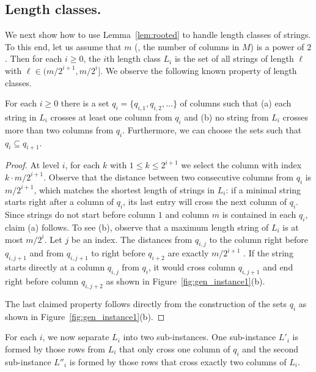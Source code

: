 \subsection{Length classes.}\label{sec:length-classes}
We next show how to use Lemma~\ref{lem:rooted} to handle length classes of strings.
To this end, let us assume \WLOG that $m$ (\ie, the number of columns in $M$) is a power of $2$.
Then for each $i \ge 0$, the $i$th length class $L_i$ is the set of all strings of length $\ell$ with $\ell \in (m/2^{i+1}, m/2^{i}]$. 
We observe the following known property of length classes.
\begin{lemma}\label{lem:half}
    For each $i \ge 0$ there is a set $q_i = \{q_{i,1},q_{i,2},\dotsc\}$ of columns such that (a) each string in $L_i$ crosses at least one column from $q_i$ and (b) no string from $L_i$ crosses more than two columns from $q_i$.
    Furthermore, we can choose the sets such that $q_i \subseteq q_{i+1}$.
\end{lemma}
\begin{proof}
    At level $i$, for each $k$ with $1 \le k \le 2^{i+1}$ we select the column with index $k \cdot m/2^{i+1}$.
    Observe that the distance between two consecutive columns from $q_i$ is $m/2^{i+1}$, which matches the shortest length of strings in $L_i$: if a minimal string starts right after a column of $q_i$, its last entry will cross the next column of $q_i$. 
    Since strings do not start before column $1$ and column $m$ is contained in each $q_i$, claim (a) follows.
    To see (b), observe that a maximum length string of $L_i$ is at most $m/2^i$.
    Let $j$ be an index. 
    The distances from $q_{i,j}$ to the column right before $q_{i,j+1}$ and from $q_{i,j+1}$ to right before $q_{i+2}$ are exactly $m/2^{i+1}$ .
    If the string starts directly at a column $q_{i,j}$ from $q_i$, it would cross column $q_{i,j+1}$ and end right before column $q_{i,j+2}$ as shown in Figure~\ref{fig:gen_instance1}(b).

    The last claimed property follows directly from the construction of the sets $q_i$ as shown in Figure~\ref{fig:gen_instance1}(b).
\end{proof}

For each $i$, we now separate $L_i$ into two sub-instances.
One sub-instance $L'_i$ is formed by those rows from $L_i$ that only cross one column of $q_i$ and the second sub-instance $L''_i$ is formed by those rows that cross exactly two columns of $L_i$.

